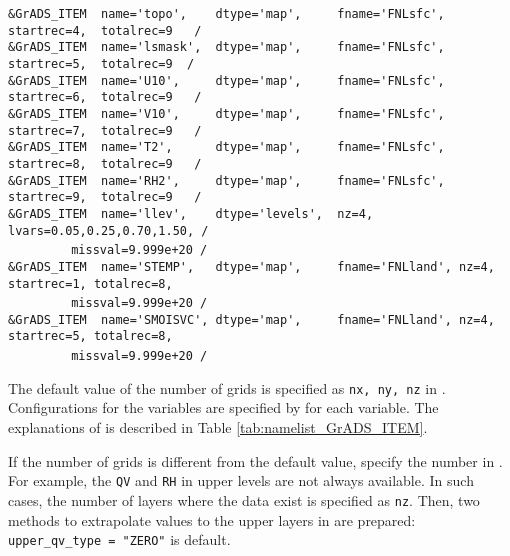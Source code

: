 {\verb|&GrADS_ITEM  name='topo',    dtype='map',     fname='FNLsfc', startrec=4,  totalrec=9   / |  \\
\verb|&GrADS_ITEM  name='lsmask',  dtype='map',     fname='FNLsfc', startrec=5,  totalrec=9  /  |  \\
\verb|&GrADS_ITEM  name='U10',     dtype='map',     fname='FNLsfc', startrec=6,  totalrec=9   / |  \\
\verb|&GrADS_ITEM  name='V10',     dtype='map',     fname='FNLsfc', startrec=7,  totalrec=9   / |  \\
\verb|&GrADS_ITEM  name='T2',      dtype='map',     fname='FNLsfc', startrec=8,  totalrec=9   / |  \\
\verb|&GrADS_ITEM  name='RH2',     dtype='map',     fname='FNLsfc', startrec=9,  totalrec=9   / |  \\
\verb|&GrADS_ITEM  name='llev',    dtype='levels',  nz=4, lvars=0.05,0.25,0.70,1.50, /        |  \\
~~~~~~~~\verb| missval=9.999e+20 /|  \\
\verb|&GrADS_ITEM  name='STEMP',   dtype='map',     fname='FNLland', nz=4, startrec=1, totalrec=8,|\\
~~~~~~~~\verb| missval=9.999e+20 /|  \\
\verb|&GrADS_ITEM  name='SMOISVC', dtype='map',     fname='FNLland', nz=4, startrec=5, totalrec=8,|\\
~~~~~~~~\verb| missval=9.999e+20 /|  \\
}

The default value of the number of grids is specified as \verb|nx, ny, nz| in .
Configurations for the variables are specified by  for each variable.
The explanations of  is described in Table \ref{tab:namelist_GrADS_ITEM}.


If the number of grids is different from the default value, specify the number in .
For example, the \verb|QV| and \verb|RH| in upper levels are not always available.
In such cases, the number of layers where the data exist is specified as \verb|nz|.
Then, two methods to extrapolate values to the upper layers in \scale are prepared:
\verb| upper_qv_type = "ZERO"| is default.



